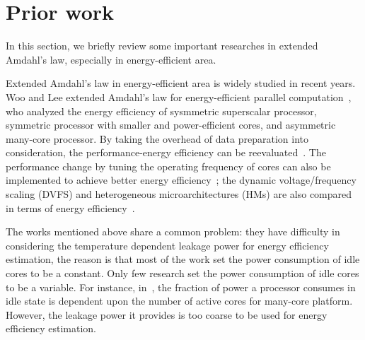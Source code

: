 \section{Prior work}
\label{sec:related_works}


In this section, we briefly review some important researches in extended Amdahl's law, especially in energy-efficient area.

Extended Amdahl's law in energy-efficient area is widely studied in recent years. Woo and Lee extended Amdahl's law for energy-efficient parallel computation~\cite{woo:Computer'08}, who analyzed the energy efficiency of sysmmetric superscalar processor, symmetric processor with smaller and power-efficient cores, and asymmetric many-core processor. By taking the overhead of data preparation into consideration, the performance-energy efficiency can be reevaluated~\cite{}. The performance change by tuning the operating frequency of cores can also be implemented to achieve better energy efficiency~\cite{kim:CAL'15,wang:access'17}; the dynamic voltage/frequency scaling (DVFS) and heterogeneous microarchitectures (HMs) are also compared in terms of energy efficiency~\cite{lukefahr:ICPAC'14}.



The works mentioned above share a common problem: they have difficulty in considering the temperature dependent leakage power for energy efficiency estimation, the reason is that most of the work set the power consumption of idle cores to be a constant. Only few research set the power consumption of idle cores to be a variable. For instance, in~\cite{karanikolaou:JS'14}, the fraction of power a processor consumes in idle state is dependent upon the number of active cores for many-core platform. However, the leakage power it provides is too coarse to be used for energy efficiency estimation.


